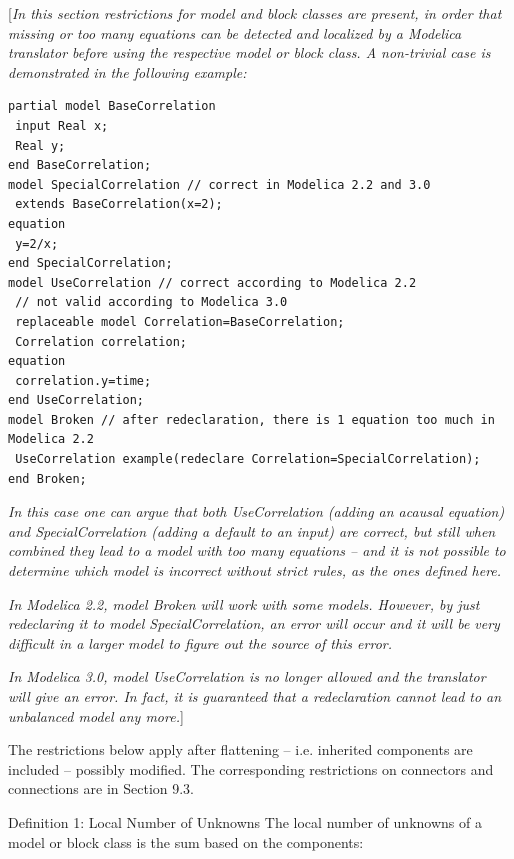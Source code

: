 \documentclass[10pt,a4paper]{report}
\def\Mcommentbegin#1{{[}\emph{#1}}
\def\Mcommentend#1{\emph{#1}{]}}
\def\Mcommentmid#1{\emph{#1}}
\begin{document}
\Mcommentbegin{In this section restrictions for model and block classes are
present, in order that missing or too many equations can be detected and
localized by a Modelica translator before using the respective model or
block class. A non-trivial case is demonstrated in the following
example:}

\begin{lstlisting}[language=modelica]
partial model BaseCorrelation
 input Real x;
 Real y;
end BaseCorrelation;
model SpecialCorrelation // correct in Modelica 2.2 and 3.0
 extends BaseCorrelation(x=2);
equation
 y=2/x;
end SpecialCorrelation;
model UseCorrelation // correct according to Modelica 2.2
 // not valid according to Modelica 3.0
 replaceable model Correlation=BaseCorrelation;
 Correlation correlation;
equation
 correlation.y=time;
end UseCorrelation;
model Broken // after redeclaration, there is 1 equation too much in Modelica 2.2
 UseCorrelation example(redeclare Correlation=SpecialCorrelation);
end Broken;
\end{lstlisting}

\Mcommentmid{In this case one can argue that both \emph{UseCorrelation} (adding
an acausal equation) and \emph{SpecialCorrelation} (adding a default to
an input) are correct, but still when combined they lead to a model with
too many equations -- and it is not possible to determine which model is
incorrect without strict rules, as the ones defined here.}

\Mcommentmid{In Modelica 2.2, model \emph{Broken} will work with some models.
However, by just redeclaring it to model \emph{SpecialCorrelation}, an
error will occur and it will be very difficult in a larger model to
figure out the source of this error. }

\Mcommentend{In Modelica 3.0, model \emph{UseCorrelation} is no longer allowed
and the translator will give an error. In fact, it is guaranteed that a
redeclaration cannot lead to an unbalanced model any more.}

The restrictions below apply after flattening -- i.e. inherited
components are included -- possibly modified. The corresponding
restrictions on connectors and connections are in Section 9.3.

{Definition 1: Local Number of Unknowns}
The local number of unknowns of a model or block class is the sum based
on the components:
\end{document}
